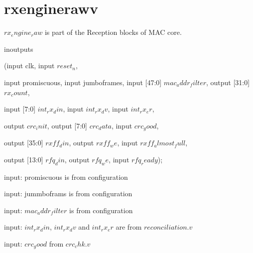 \chapter{rxenginerawv}

$rx_engine_raw$ is part of the Reception blocks of MAC core.

\begin{chunk}{inoutputs}

(input clk, input $reset_n$,

 input        promiscuous,
 input        jumboframes,
 input [47:0] $mac_addr_filter$,
 output [31:0] $rx_count$,

 input [7:0] $int_rx_din$,
 input       $int_rx_dv$,
 input       $int_rx_er$,

 output       $crc_init$,
 output [7:0] $crc_data$,
 input        $crc_good$,

 output [35:0] $rxff_din$,
 output       $rxff_we$,
 input        $rxff_almost_full$,

 output [13:0] $rfq_din$,
 output        $rfq_we$,
 input         $rfq_ready$);

\end{chunk}


input: promiscuous is from configuration

input: jummboframs is from configuration

input: $mac_addr_filter$ is from configuration

input: $int_rx_din$, $int_rx_dv$ and $int_rx_er$ are from $reconciliation.v$

input: $crc_good$ from $crc_chk.v$





